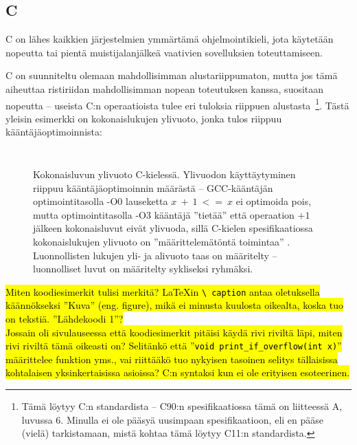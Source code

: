 \subsection{C}

C on lähes kaikkien järjestelmien ymmärtämä ohjelmointikieli, jota käytetään
nopeutta tai pientä muistijalanjälkeä vaativien sovelluksien toteuttamiseen.

C on suunniteltu olemaan mahdollisimman alustariippumaton, mutta jos tämä
aiheuttaa ristiriidan mahdollisimman nopean toteutuksen kanssa, suositaan
nopeutta -- useista C:n operaatioista tulee eri tuloksia riippuen
alustasta~\citationneeded\footnote{\label{cspecnote}Tämä löytyy C:n standardista
-- C90:n spesifikaatiossa tämä on liitteessä A, luvussa 6. Minulla ei ole
pääsyä uusimpaan spesifikaatioon, eli en pääse (vielä) tarkistamaan, mistä
kohtaa tämä löytyy C11:n standardista.}. Tästä yleisin esimerkki on
kokonaislukujen ylivuoto, jonka tulos riippuu kääntäjäoptimoinnista:

\begin{figure}[ht!]
    \inputminted{C}{c-overflow.c}
    \inputminted{text}{c-overflow-output}

    \caption{Kokonaisluvun ylivuoto C-kielessä. Ylivuodon käyttäytyminen
    riippuu kääntäjäoptimoinnin määrästä -- GCC-kääntäjän optimointitasolla -O0
    lauseketta $x~+~1~<=~x$ ei optimoida pois, mutta optimointitasolla -O3
    kääntäjä ''tietää'' että operaation $+1$ jälkeen kokonaisluvut eivät
    ylivuoda, sillä C-kielen spesifikaatiossa kokonaislukujen ylivuoto on
    ''määrittelemätöntä toimintaa'' .
    Luonnollisten lukujen yli- ja alivuoto taas on määritelty -- luonnolliset
    luvut on määritelty sykliseksi ryhmäksi.}
\end{figure}

\FloatBarrier

\hl{Miten koodiesimerkit tulisi merkitä? LaTeXin \texttt{\textbackslash
caption} antaa oletuksella käännökseksi ''Kuva'' (eng. figure), mikä ei minusta
kuulosta oikealta, koska tuo on tekstiä. ''Lähdekoodi 1''? \\

Jossain oli sivulauseessa että koodiesimerkit pitäisi käydä rivi riviltä läpi,
miten rivi riviltä tämä oikeasti on? Selitänkö että ''\texttt{void
print\_if\_overflow(int x)}'' määrittelee funktion yms., vai riittääkö tuo
nykyisen tasoinen selitys tällaisissa kohtalaisen yksinkertaisissa asioissa?
C:n syntaksi kun ei ole erityisen esoteerinen.}

